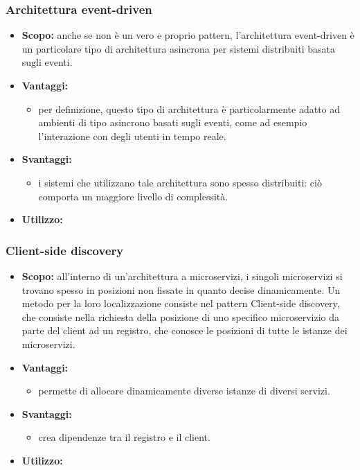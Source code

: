     \subsubsection{Architettura event-driven}
      \begin{itemize}
       \item \textbf{Scopo:} anche se non è un vero e proprio pattern, l'architettura event-driven è un particolare tipo di architettura asincrona per sistemi distribuiti basata sugli eventi.
	\item \textbf{Vantaggi:}
	  \begin{itemize}
	   \item per definizione, questo tipo di architettura è particolarmente adatto ad ambienti di tipo asincrono basati sugli eventi, come ad esempio l'interazione con degli utenti in tempo reale.
	  \end{itemize}
	\item \textbf{Svantaggi:}
	  \begin{itemize}
	   \item i sistemi che utilizzano tale architettura sono spesso distribuiti: ciò comporta un maggiore livello di complessità.
	  \end{itemize}
	\item \textbf{Utilizzo:}
	\end{itemize}
     
     \subsubsection{Client-side discovery}
      \begin{itemize}
       \item \textbf{Scopo:} all'interno di un'architettura a microservizi, i singoli microservizi si trovano spesso in posizioni non fissate in quanto decise dinamicamente. Un metodo per la loro localizzazione consiste nel pattern Client-side discovery, che consiste nella richiesta della posizione di uno specifico microservizio da parte del client ad un registro, che conosce le posizioni di tutte le istanze dei microservizi. 
	\item \textbf{Vantaggi:}
	  \begin{itemize}
	   \item permette di allocare dinamicamente diverse istanze di diversi servizi.
	  \end{itemize}
	\item \textbf{Svantaggi:}
	  \begin{itemize}
	   \item crea dipendenze tra il registro e il client.
	  \end{itemize}
	\item \textbf{Utilizzo:}
	\end{itemize}

